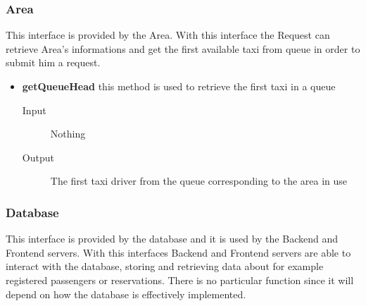 		\subsubsection{Area} 
		This interface is provided by the Area. With this interface the Request can retrieve Area's informations and get the first available taxi from queue in order to submit him a request.
		\begin{itemize}
			\item \textbf{getQueueHead} this method is used to retrieve the first taxi in a queue
			\begin{description}
				\item[Input] Nothing
				\item[Output] The first taxi driver from the queue corresponding to the area in use
			\end{description}
		\end{itemize}
		\subsubsection{Database} 
		This interface is provided by the database and it is used by the Backend and Frontend servers. With this interfaces Backend and Frontend servers are able to interact with the database, storing and retrieving data about for example registered passengers or reservations. There is no particular function since it will depend on how the database is effectively implemented.
	\newpage
